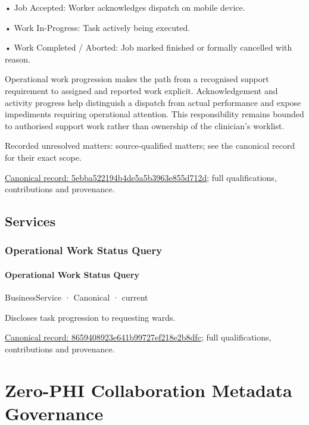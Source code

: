 •
Job Accepted: Worker acknowledges dispatch on mobile device.



•
Work In-Progress: Task actively being executed.



•
Work Completed / Aborted: Job marked finished or formally cancelled with reason.



Operational work progression makes the path from a recognised support requirement to assigned and reported work explicit. Acknowledgement and activity progress help distinguish a dispatch from actual performance and expose impediments requiring operational attention. This responsibility remains bounded to authorised support work rather than ownership of the clinician's worklist.


{\small Recorded unresolved matters: source-qualified matters; see the canonical record for their exact scope.}\par
{\footnotesize \href{../../../../continuum/business/business-process/5ebba522194b4de5a5b3963e855d712d.md}{Canonical record: 5ebba522194b4de5a5b3963e855d712d}; full qualifications, contributions and provenance.}\par
\subsection{Services}

\subsubsection{Operational Work Status Query}

\paragraph{Operational Work Status Query}

\label{element:8659408923e641b99727ef218e2b8dfc}
{\small BusinessService · Canonical · current}\par

Discloses task progression to requesting wards.


{\footnotesize \href{../../../../continuum/business/business-service/8659408923e641b99727ef218e2b8dfc.md}{Canonical record: 8659408923e641b99727ef218e2b8dfc}; full qualifications, contributions and provenance.}\par
\section{Zero-PHI Collaboration Metadata Governance}


